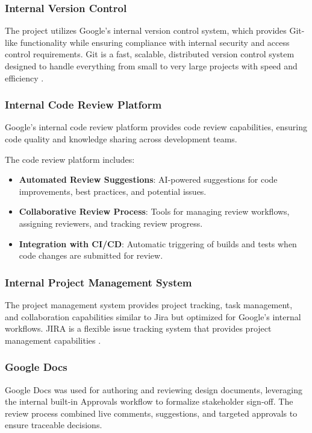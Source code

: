 \begin{spacing}{1.2}
\subsubsection{Internal Version Control}
The project utilizes Google's internal version control system, which provides Git-like functionality while ensuring compliance with internal security and access control requirements. Git is a fast, scalable, distributed version control system designed to handle everything from small to very large projects with speed and efficiency \cite{git2005}.


\subsubsection{Internal Code Review Platform}
Google's internal code review platform provides code review capabilities, ensuring code quality and knowledge sharing across development teams.

The code review platform includes:
\begin{itemize}
    \item \textbf{Automated Review Suggestions}: AI-powered suggestions for code improvements, best practices, and potential issues.
    \item \textbf{Collaborative Review Process}: Tools for managing review workflows, assigning reviewers, and tracking review progress.
    \item \textbf{Integration with CI/CD}: Automatic triggering of builds and tests when code changes are submitted for review.
\end{itemize}

\subsubsection{Internal Project Management System}
The project management system provides project tracking, task management, and collaboration capabilities similar to Jira but optimized for Google's internal workflows. JIRA is a flexible issue tracking system that provides project management capabilities \cite{jira2002}.


\subsubsection{Google Docs}
Google Docs was used for authoring and reviewing design documents, leveraging the internal built-in Approvals workflow to formalize stakeholder sign-off. The review process combined live comments, suggestions, and targeted approvals to ensure traceable decisions.



\end{spacing}
